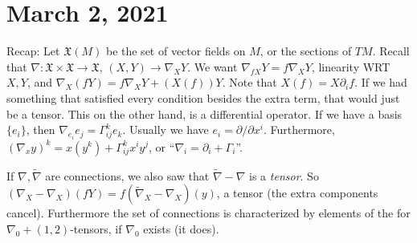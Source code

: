 \section{March 2, 2021} 
Recap: Let $\mathfrak X(M)$ be the set of vector fields on $M$, or the sections of $TM$. Recall that $\nabla \colon \mathfrak X\times \mathfrak X \to \mathfrak X$, $(X,Y) \to \nabla_XY$. We want $\nabla _{fX}Y=f\nabla_XY$, linearity WRT $X,Y$, and $\nabla_X(fY)=f\nabla_XY+(X(f))Y$. Note that $X(f)=X\partial _i f$. If we had something that satisfied every condition besides the extra term, that would just be a tensor. This on the other hand, is a differential operator. If we have a basis $\{e_i \} $, then $\nabla _{e_i }e_j =\Gamma _{ij}^ke_k$. Usually we have $e_i = \partial  /\partial x^i$. Furthermore, $(\nabla_xy)^k=x(y^k)+\Gamma _{ij}^kx^i y^j $, or ``$\nabla_i =\partial _i +\Gamma _i $''.

If $\nabla,\widetilde \nabla$ are connections, we also saw that $\widetilde \nabla-\nabla$ is a \emph{tensor}. So $(\nabla_X-\nabla_X)(fY)=f(\widetilde \nabla_X-\nabla_X)(y)$, a tensor (the extra components cancel). Furthermore the set of connections is characterized by elements of the for $\nabla_0+(1,2)$-tensors, if $\nabla_0$ exists (it does).

